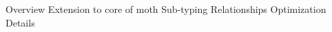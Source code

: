 \begin{outline}

\1 Overview
\1 Extension to core of moth
\1 Sub-typing Relationships
\1 Optimization Details

\end{outline}